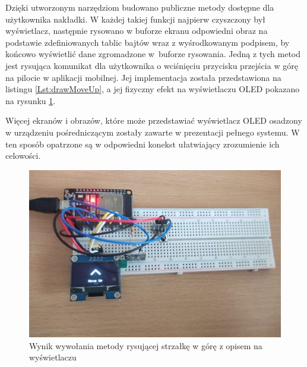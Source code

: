 \documentclass[12pt,twoside]{article}
\begin{document}


Dzięki utworzonym narzędziom budowano publiczne metody dostępne dla użytkownika nakładki. W każdej takiej funkcji najpierw czyszczony był wyświetlacz, następnie rysowano w buforze ekranu odpowiedni obraz na podstawie zdefiniowanych tablic bajtów wraz z wyśrodkowanym podpisem, by końcowo wyświetlić dane zgromadzone w~buforze rysowania. Jedną z tych metod jest  rysująca komunikat dla użytkownika o wciśnięciu przycisku przejścia w górę na pilocie w aplikacji mobilnej. Jej implementacja została przedstawiona na listingu \ref*{Lst:drawMoveUp}, a jej fizyczny efekt na wyświetlaczu OLED pokazano na rysunku \ref*{Fig:drawMoveUp}.



Więcej ekranów i obrazów, które może przedstawiać wyświetlacz OLED osadzony w urządzeniu pośredniczącym zostały zawarte w prezentacji pełnego systemu. W ten sposób opatrzone są w odpowiedni konekst ułatwiający zrozumienie ich celowości.

\begin{figure}[ht]
   \centering
   \includegraphics[width=14cm]{images/drawMoveUp.jpg}
   \caption{Wynik wywołania metody rysującej strzałkę w górę z opisem na wyświetlaczu}
   \label{Fig:drawMoveUp}
\end{figure}

\clearpage
\end{document}
